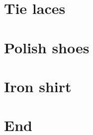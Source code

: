 \documentclass{article}
\begin{document}
\section{Tie laces}\label{PM-tyinglaces}
\section{Polish shoes}\label{PM-polishshoes}
\section{Iron shirt}\label{PM-ironshirt}

\section{End}

\end{document}
